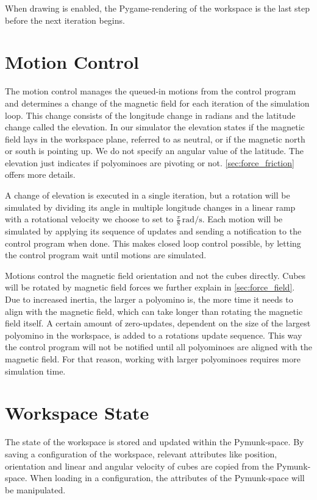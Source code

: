 When drawing is enabled, the Pygame-rendering of the workspace is the last step before the next iteration begins.


\section{Motion Control}
\label{sec:motion_control}

The motion control manages the queued-in motions from the control program and determines a change of the magnetic field for each iteration of the simulation loop.
This change consists of the longitude change in radians and the latitude change called the elevation.
In our simulator the elevation states if the magnetic field lays in the workspace plane, referred to as neutral, or if the magnetic north or south is pointing up.
We do not specify an angular value of the latitude.
The elevation just indicates if polyominoes are pivoting or not.
\autoref{sec:force_friction} offers more details.

A change of elevation is executed in a single iteration, but a rotation will be simulated by dividing its angle in multiple longitude changes in a linear ramp with a rotational velocity we choose to set to $\frac{\pi}{8} \, \text{rad}/\text{s}$.
Each motion will be simulated by applying its sequence of updates and sending a notification to the control program when done.
This makes closed loop control possible, by letting the control program wait until motions are simulated.

Motions control the magnetic field orientation and not the cubes directly.
Cubes will be rotated by magnetic field forces we further explain in \autoref{sec:force_field}.
Due to increased inertia, the larger a polyomino is, the more time it needs to align with the magnetic field, which can take longer than rotating the magnetic field itself.
A certain amount of zero-updates, dependent on the size of the largest polyomino in the workspace, is added to a rotations update sequence.
This way the control program will not be notified until all polyominoes are aligned with the magnetic field.
For that reason, working with larger polyominoes requires more simulation time.



\section{Workspace State}
\label{sec:workspace_state}

The state of the workspace is stored and updated within the Pymunk-space.
By saving a configuration of the workspace, relevant attributes like position, orientation and linear and angular velocity of cubes are copied from the Pymunk-space.
When loading in a configuration, the attributes of the Pymunk-space will be manipulated.

